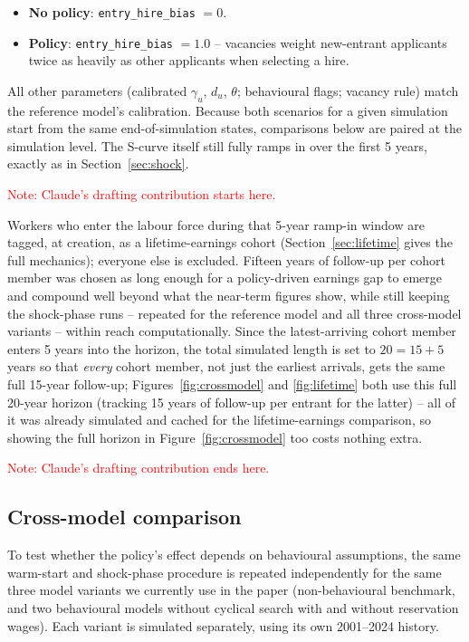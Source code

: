 \documentclass{article}
\begin{document}
\begin{itemize}
  \item \textbf{No policy}: \texttt{entry\_hire\_bias} $=0$.
  \item \textbf{Policy}: \texttt{entry\_hire\_bias} $=1.0$ -- vacancies weight new-entrant applicants
  twice as heavily as other applicants when selecting a hire.
\end{itemize}

All other parameters (calibrated $\gamma_u$, $d_u$, $\theta$; behavioural flags; vacancy rule) match
the reference model's calibration. Because both scenarios for a given simulation start from the same
end-of-simulation states, comparisons below are paired at the simulation level. The S-curve itself
still fully ramps in over the first 5 years, exactly as in Section~\ref{sec:shock}.

\textcolor{red}{Note: Claude's drafting contribution starts here.}

Workers who enter the labour force during that 5-year ramp-in window are tagged, at creation, as a
lifetime-earnings cohort (Section~\ref{sec:lifetime} gives the full mechanics); everyone else is
excluded. Fifteen years of follow-up per cohort member was chosen as long enough for a policy-driven
earnings gap to emerge and compound well beyond what the near-term figures show, while still keeping
the shock-phase runs -- repeated for the reference model and all three cross-model variants -- within
reach computationally. Since the latest-arriving cohort member enters 5 years into the horizon, the
total simulated length is set to $20 = 15 + 5$ years so that \emph{every} cohort member, not just the
earliest arrivals, gets the same full 15-year follow-up; Figures~\ref{fig:crossmodel} and
\ref{fig:lifetime} both use this full 20-year horizon (tracking 15 years of follow-up per entrant for
the latter) -- all of it was already simulated and cached for the lifetime-earnings comparison, so
showing the full horizon in Figure~\ref{fig:crossmodel} too costs nothing extra.

\textcolor{red}{Note: Claude's drafting contribution ends here.}

\subsection{Cross-model comparison}
\label{sec:crossmodel}

To test whether the policy's effect depends on behavioural assumptions, the same warm-start and
shock-phase procedure is repeated independently for the same three model variants we currently use in the paper (non-behavioural benchmark, and two behavioural models without cyclical search with and without reservation wages). Each variant is simulated separately, using
its own 2001--2024 history.
\end{document}
